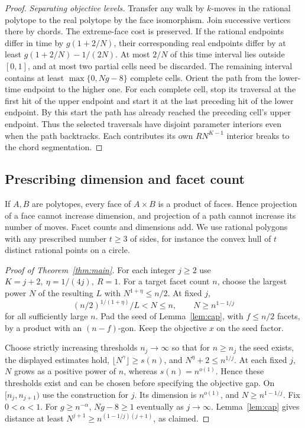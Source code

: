 \begin{proof}
\emph{Separating objective levels.}
Transfer any walk by \(k\)-moves in the rational polytope to the real polytope by the face isomorphism. Join successive vertices there by chords. The extreme-face cost is preserved. If the rational endpoints differ in time by \(g(1+2/N)\), their corresponding real endpoints differ by at least \(g(1+2/N)-1/(2N)\). At most \(2/N\) of this time interval lies outside \([0,1]\), and at most two partial cells need be discarded. The remaining interval contains at least \(\max\{0,Ng-8\}\) complete cells. Orient the path from the lower-time endpoint to the higher one. For
each complete cell, stop its traversal at the first hit of the upper
endpoint and start it at the last preceding hit of the lower endpoint.
By this start the path has already reached the preceding cell's upper
endpoint. Thus the selected traversals have disjoint parameter
interiors even when the path backtracks. Each contributes its own
\(RN^{K-1}\) interior breaks to the chord segmentation.
\end{proof}

\subsection{Prescribing dimension and facet count}
If \(A,B\) are polytopes, every face of \(A\times B\) is a product of faces. Hence projection of a face cannot increase dimension, and projection of a path cannot increase its number of moves. Facet counts and dimensions add. We use rational polygons with any prescribed number \(t\ge3\) of sides, for instance the convex hull of \(t\) distinct rational points on a circle.

\begin{proof}[Proof of Theorem~\ref{thm:main}]
For each integer \(j\ge2\) use \(K=j+2,\ \eta=1/(4j),\ R=1\). For a target facet count \(n\), choose the largest power \(N\) of the resulting \(L\) with \(N^{1+\eta}\le n/2\). At fixed \(j\),
\[
 (n/2)^{1/(1+\eta)}/L<N\le n,\qquad N\ge n^{1-1/j}
\]
for all sufficiently large \(n\). Pad the seed of Lemma~\ref{lem:cap}, with \(f\le n/2\) facets, by a product with an \((n-f)\)-gon. Keep the objective \(x\) on the seed factor.

Choose strictly increasing thresholds \(n_j\to\infty\) so that for \(n\ge n_j\) the seed exists, the displayed estimates hold, \(\lfloor N^\gamma\rfloor\ge s(n)\), and \(N^\eta+2\le n^{1/j}\). At each fixed \(j\), \(N\) grows as a positive power of \(n\), whereas
\(s(n)=n^{o(1)}\). Hence these thresholds exist and can be chosen
before specifying the objective gap. On \([n_j,n_{j+1})\) use the construction for \(j\). Its dimension is \(n^{o(1)}\), and \(N\ge n^{1-1/j}\). Fix \(0<\alpha<1\). For \(g\ge n^{-\alpha}\), \(Ng-8\ge1\) eventually as \(j\to\infty\). Lemma~\ref{lem:cap} gives distance at least \(N^{j+1}\ge n^{(1-1/j)(j+1)}\), as claimed.
\end{proof}

